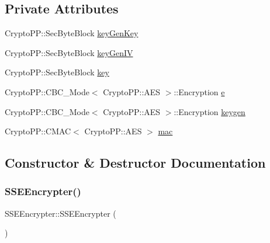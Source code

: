 \subsection*{Private Attributes}
\begin{DoxyCompactItemize}
\item 
Crypto\+P\+P\+::\+Sec\+Byte\+Block \hyperlink{classSSEEncrypter_a35dbd89d8820118bf71d6cd483e64ac8}{key\+Gen\+Key}
\item 
Crypto\+P\+P\+::\+Sec\+Byte\+Block \hyperlink{classSSEEncrypter_ab6fb0b44e024a40077fd44672ad78f28}{key\+Gen\+IV}
\item 
Crypto\+P\+P\+::\+Sec\+Byte\+Block \hyperlink{classSSEEncrypter_afc4ceb0c421614857c18b152a976c29a}{key}
\item 
Crypto\+P\+P\+::\+C\+B\+C\+\_\+\+Mode$<$ Crypto\+P\+P\+::\+A\+ES $>$\+::Encryption \hyperlink{classSSEEncrypter_a2831d301099a3d5548479996e3c8cf4b}{e}
\item 
Crypto\+P\+P\+::\+C\+B\+C\+\_\+\+Mode$<$ Crypto\+P\+P\+::\+A\+ES $>$\+::Encryption \hyperlink{classSSEEncrypter_a43d9006f3db0d57fa02069977946335b}{keygen}
\item 
Crypto\+P\+P\+::\+C\+M\+AC$<$ Crypto\+P\+P\+::\+A\+ES $>$ \hyperlink{classSSEEncrypter_a67939726bb84cb761535642873c3b10c}{mac}
\end{DoxyCompactItemize}


\subsection{Constructor \& Destructor Documentation}
\mbox{\label{classSSEEncrypter_a4b45442fa1025d82ed499241da4796bf}} 
\subsubsection{\texorpdfstring{S\+S\+E\+Encrypter()}{SSEEncrypter()}\hspace{0.1cm}{\footnotesize\ttfamily [1/2]}}
{\footnotesize\ttfamily S\+S\+E\+Encrypter\+::\+S\+S\+E\+Encrypter (\begin{DoxyParamCaption}{ }\end{DoxyParamCaption})}

\mbox{\label{classSSEEncrypter_ae109735e8bf9f5a32d6f481e6d208bd8}} 
